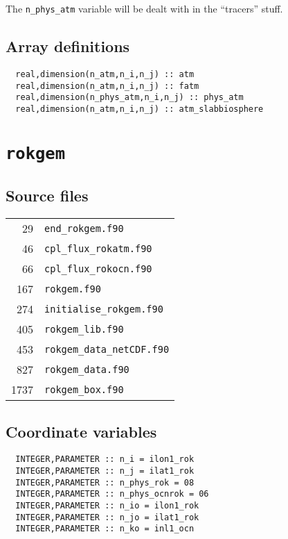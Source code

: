 \documentclass[a4paper,10pt,article]{memoir}
\begin{document}
The \texttt{n\_phys\_atm} variable will be dealt with in the
``tracers'' stuff.

\section{Array definitions}

\begin{verbatim}
  real,dimension(n_atm,n_i,n_j) :: atm
  real,dimension(n_atm,n_i,n_j) :: fatm
  real,dimension(n_phys_atm,n_i,n_j) :: phys_atm
  real,dimension(n_atm,n_i,n_j) :: atm_slabbiosphere
\end{verbatim}


\chapter{\texttt{rokgem}}

\section{Source files}

\begin{tabular}{rl}
  29 & \texttt{end\_rokgem.f90} \\
  46 & \texttt{cpl\_flux\_rokatm.f90} \\
  66 & \texttt{cpl\_flux\_rokocn.f90} \\
 167 & \texttt{rokgem.f90} \\
 274 & \texttt{initialise\_rokgem.f90} \\
 405 & \texttt{rokgem\_lib.f90} \\
 453 & \texttt{rokgem\_data\_netCDF.f90} \\
 827 & \texttt{rokgem\_data.f90} \\
1737 & \texttt{rokgem\_box.f90} \\
\end{tabular}

\section{Coordinate variables}

\begin{verbatim}
  INTEGER,PARAMETER :: n_i = ilon1_rok
  INTEGER,PARAMETER :: n_j = ilat1_rok
  INTEGER,PARAMETER :: n_phys_rok = 08
  INTEGER,PARAMETER :: n_phys_ocnrok = 06
  INTEGER,PARAMETER :: n_io = ilon1_rok
  INTEGER,PARAMETER :: n_jo = ilat1_rok
  INTEGER,PARAMETER :: n_ko = inl1_ocn
\end{verbatim}
\end{document}
